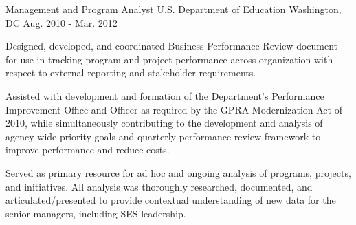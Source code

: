 \begin{cventries}
  \cventry
    {Management and Program Analyst} %
    {U.S. Department of Education} %
    {Washington, DC} %
    {Aug. 2010 - Mar. 2012} %
    {
      \begin{cvitems} %
        \item {Designed, developed, and coordinated Business Performance Review document for use in tracking program and project performance across organization with respect to external reporting and stakeholder requirements.}
        \item {Assisted with development and formation of the Department’s Performance Improvement Office and Officer as required by the GPRA Modernization Act of 2010, while simultaneously contributing to the development and analysis of agency wide priority goals and quarterly performance review framework to improve performance and reduce costs.}
        \item {Served as primary resource for ad hoc and ongoing analysis of programs, projects, and initiatives. All analysis was thoroughly researched, documented, and articulated/presented to provide contextual understanding of new data for the senior managers, including SES leadership.}
      \end{cvitems}
    }

\end{cventries}
